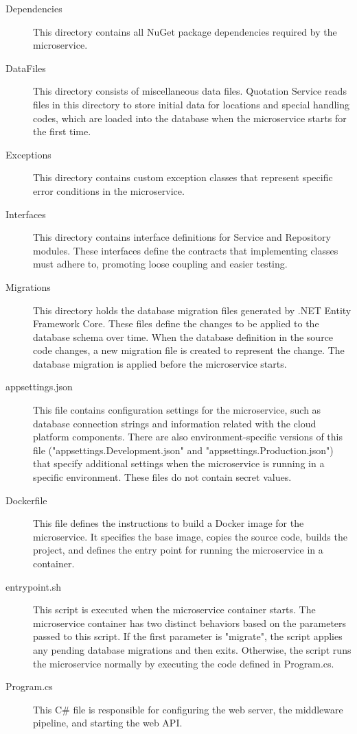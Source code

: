 \documentclass[12pt,reqno, oneside]{amsbook}
\theoremstyle{definition}
\theoremstyle{definition}
\numberwithin{section}{chapter}
\numberwithin{table}{chapter}
\numberwithin{figure}{chapter}
\begin{document}
\begin{description}
  \item[Dependencies] This directory contains all NuGet package dependencies required by the microservice.
  \item[DataFiles] This directory consists of miscellaneous data files. Quotation Service reads files in this directory to store initial data for locations and special handling codes, which are loaded into the database when the microservice starts for the first time.
  \item[Exceptions] This directory contains custom exception classes that represent specific error conditions in the microservice.
  \item[Interfaces] This directory contains interface definitions for Service and Repository modules. These interfaces define the contracts that implementing classes must adhere to, promoting loose coupling and easier testing.
  \item[Migrations] This directory holds the database migration files generated by .NET Entity Framework Core. These files define the changes to be applied to the database schema over time. When the database definition in the source code changes, a new migration file is created to represent the change. The database migration is applied before the microservice starts.
  \item[appsettings.json] This file contains configuration settings for the microservice, such as database connection strings and information related with the cloud platform components. There are also environment-specific versions of this file ("appsettings.Development.json" and "appsettings.Production.json") that specify additional settings when the microservice is running in a specific environment. These files do not contain secret values.
  \item[Dockerfile] This file defines the instructions to build a Docker image for the microservice. It specifies the base image, copies the source code, builds the project, and defines the entry point for running the microservice in a container.
  \item[entrypoint.sh] This script is executed when the microservice container starts. The microservice container has two distinct behaviors based on the parameters passed to this script. If the first parameter is "migrate", the script applies any pending database migrations and then exits. Otherwise, the script runs the microservice normally by executing the code defined in Program.cs.
  \item[Program.cs] This C\# file is responsible for configuring the web server, the middleware pipeline, and starting the web \ac{API}.
\end{description}
\end{document}
